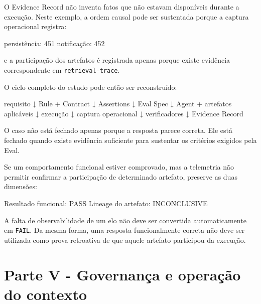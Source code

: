 \documentclass[
  10pt,
  a4paper,
  oneside]{book}
\newenvironment{Shaded}{}{}
\newcommand{\NormalTok}[1]{#1}
\renewenvironment{Shaded}{\begin{snugshade}}{\end{snugshade}}%
\begin{document}
O Evidence Record não inventa fatos que não estavam disponíveis durante
a execução. Neste exemplo, a ordem causal pode ser sustentada porque a
captura operacional registra:

\begin{Shaded}
\begin{Highlighting}[]
\NormalTok{persistência: 451}
\NormalTok{notificação: 452}
\end{Highlighting}
\end{Shaded}

e a participação dos artefatos é registrada apenas porque existe
evidência correspondente em \texttt{retrieval-trace}.

O ciclo completo do estudo pode então ser reconstruído:

\begin{Shaded}
\begin{Highlighting}[]
\NormalTok{requisito}
\NormalTok{        ↓}
\NormalTok{Rule + Contract}
\NormalTok{        ↓}
\NormalTok{Assertions}
\NormalTok{        ↓}
\NormalTok{Eval Spec}
\NormalTok{        ↓}
\NormalTok{Agent + artefatos aplicáveis}
\NormalTok{        ↓}
\NormalTok{execução}
\NormalTok{        ↓}
\NormalTok{captura operacional}
\NormalTok{        ↓}
\NormalTok{verificadores}
\NormalTok{        ↓}
\NormalTok{Evidence Record}
\end{Highlighting}
\end{Shaded}

O caso não está fechado apenas porque a resposta parece correta. Ele
está fechado quando existe evidência suficiente para sustentar os
critérios exigidos pela Eval.

Se um comportamento funcional estiver comprovado, mas a telemetria não
permitir confirmar a participação de determinado artefato, preserve as
duas dimensões:

\begin{Shaded}
\begin{Highlighting}[]
\NormalTok{Resultado funcional: PASS}
\NormalTok{Lineage do artefato: INCONCLUSIVE}
\end{Highlighting}
\end{Shaded}

A falta de observabilidade de um elo não deve ser convertida
automaticamente em \texttt{FAIL}. Da mesma forma, uma resposta
funcionalmente correta não deve ser utilizada como prova retroativa de
que aquele artefato participou da execução.

\newpage

\hypertarget{parte-v---governanuxe7a-e-operauxe7uxe3o-do-contexto}{%
\chapter{Parte V - Governança e operação do
contexto}\label{parte-v---governanuxe7a-e-operauxe7uxe3o-do-contexto}}
\end{document}
